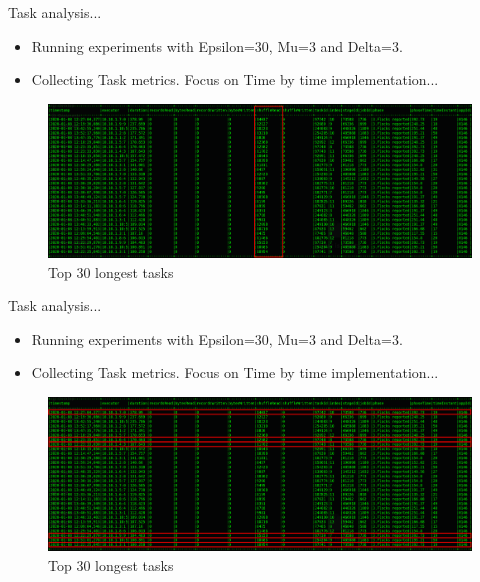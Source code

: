 \documentclass{beamer}
\begin{document}
\begin{frame}{Task analysis...}
    \begin{itemize}
        \item Running experiments with Epsilon=30, Mu=3 and Delta=3.
        \item Collecting Task metrics.  Focus on Time by time implementation...
    \end{itemize}
    \begin{figure}
        \includegraphics[width=1\textwidth]{figures/TaskAnalysisFF1}
        \caption{\small Top 30 longest tasks}
    \end{figure}
\end{frame}

\begin{frame}{Task analysis...}
    \begin{itemize}
        \item Running experiments with Epsilon=30, Mu=3 and Delta=3.
        \item Collecting Task metrics.  Focus on Time by time implementation...
    \end{itemize}
    \begin{figure}
        \includegraphics[width=1\textwidth]{figures/TaskAnalysisFF2}
        \caption{\small Top 30 longest tasks}
    \end{figure}
\end{frame}
\end{document}
